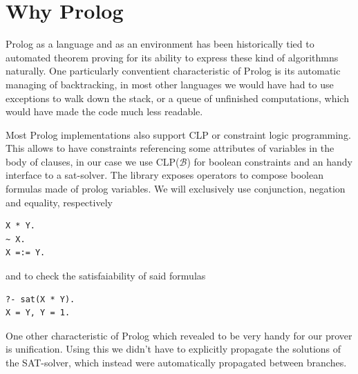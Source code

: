 \documentclass[a4paper, 12pt, tesi, english]{report}
\begin{document}




\section{Why Prolog}
Prolog as a language and as an environment has been historically tied to automated theorem proving for its ability to express these kind of algorithmns naturally.
One particularly conventient characteristic of Prolog is its automatic managing of backtracking, in most other languages we would have had to use exceptions to walk down the stack, or a queue of unfinished computations, which would have made the code much less readable.

Most Prolog implementations also support CLP or constraint logic programming.
This allows to have constraints referencing some attributes of variables in the body of clauses, in our case we use CLP($\mathcal{B}$) for boolean constraints and an handy interface to a sat-solver.
The library exposes operators to compose boolean formulas made of prolog variables.
We will exclusively use conjunction, negation and equality, respectively 
\begin{verbatim}
X * Y.
~ X.
X =:= Y.
\end{verbatim}
and to check the satisfaiability of said formulas
\begin{verbatim}
?- sat(X * Y).
X = Y, Y = 1.
\end{verbatim}

One other characteristic of Prolog which revealed to be very handy for our prover is unification.
Using this we didn't have to explicitly propagate the solutions of the SAT-solver, which instead were automatically propagated between branches.
\end{document}
